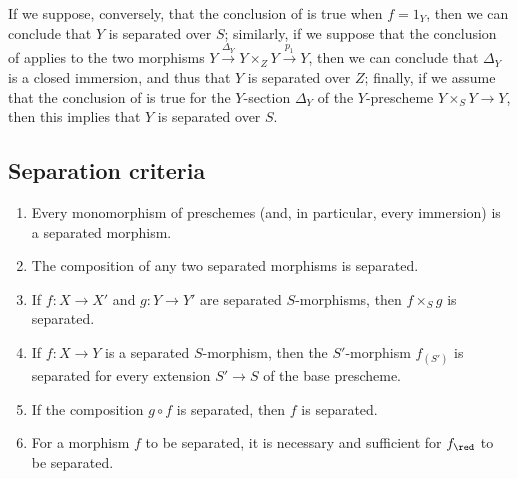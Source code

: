 \begin{remark}[5.4.8]
\label{I.5.4.8}
If we suppose, conversely, that the conclusion of  is true when $f=1_Y$, then we can conclude that $Y$ is separated over $S$;
similarly, if we suppose that the conclusion of  applies to the two morphisms $Y\xrightarrow{\Delta_Y}Y\times_Z Y\xrightarrow{p_1}Y$, then we can conclude that $\Delta_Y$ is a closed immersion, and thus that $Y$ is separated over $Z$;
finally, if we assume that the conclusion of  is true for the $Y$-section $\Delta_Y$ of the $Y$-prescheme $Y\times_S Y\to Y$, then this implies that $Y$ is separated over $S$.
\end{remark}

\subsection{Separation criteria}
\label{subsection:I.5.5}

\begin{proposition}[5.5.1]
\label{I.5.5.1}
\medskip\noindent
\begin{enumerate}
  \item[{\rm(i)}] Every monomorphism of preschemes (and, in particular, every immersion) is a separated morphism.
  \item[{\rm(ii)}] The composition of any two separated morphisms is separated.
  \item[{\rm(iii)}] If $f:X\to X'$ and $g:Y\to Y'$ are separated $S$-morphisms, then $f\times_S g$ is separated.
  \item[{\rm(iv)}] If $f:X\to Y$ is a separated $S$-morphism, then the $S'$-morphism $f_{(S')}$ is separated for every extension $S'\to S$ of the base prescheme.
  \item[{\rm(v)}] If the composition $g\circ f$ is separated, then $f$ is separated.
  \item[{\rm(vi)}] For a morphism $f$ to be separated, it is necessary and sufficient for $f_\red$  to be separated.
\end{enumerate}
\end{proposition}

